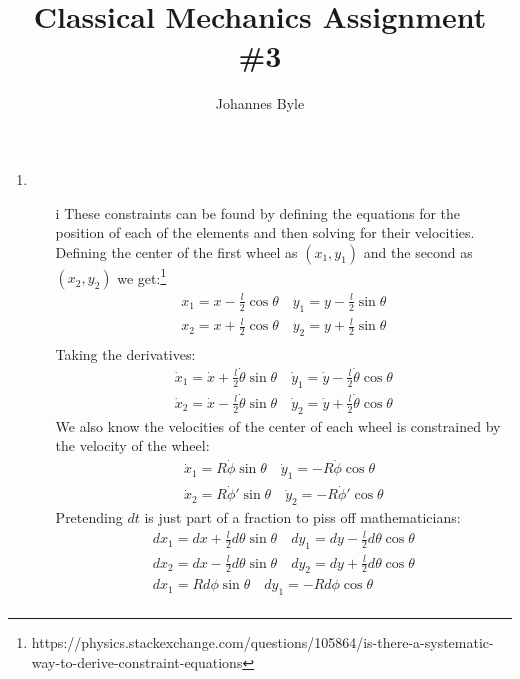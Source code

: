 \documentclass[12pt]{article}
\title{Classical Mechanics Assignment \#3}
\author{Johannes Byle}
\begin{document}
    \maketitle
    \begin{enumerate}
        \item
        \begin{enumerate}
            \item[i] These constraints can be found by defining the equations for the position of each of the elements and then solving for their velocities.
            Defining the center of the first wheel as $(x_1,y_1)$ and the second as $(x_2,y_2)$ we get:\footnote{https://physics.stackexchange.com/questions/105864/is-there-a-systematic-way-to-derive-constraint-equations}
            \begin{gather*}
                x_1=x-\frac{l}{2}\cos\theta\quad y_1=y-\frac{l}{2}\sin\theta\\
                x_2=x+\frac{l}{2}\cos\theta\quad y_2=y+\frac{l}{2}\sin\theta\\
            \end{gather*}
            Taking the derivatives:
            \begin{gather*}
                \dot{x}_1=\dot{x}+\frac{l}{2}\dot{\theta}\sin\theta\quad \dot{y}_1=\dot{y}-\frac{l}{2}\dot{\theta}\cos\theta\\
                \dot{x}_2=\dot{x}-\frac{l}{2}\dot{\theta}\sin\theta\quad \dot{y}_2=\dot{y}+\frac{l}{2}\dot{\theta}\cos\theta
            \end{gather*}
            We also know the velocities of the center of each wheel is constrained by the velocity of the wheel:
            \begin{gather*}
                \dot{x}_1=R\dot{\phi}\sin\theta\quad \dot{y}_1=-R\dot{\phi}\cos\theta\\
                \dot{x}_2=R\dot{\phi}'\sin\theta\quad \dot{y}_2=-R\dot{\phi}'\cos\theta
            \end{gather*}
            Pretending $dt$ is just part of a fraction to piss off mathematicians:
            \begin{gather*}
                dx_1=dx+\frac{l}{2}d\theta\sin\theta\quad dy_1=dy-\frac{l}{2}d\theta\cos\theta\\
                dx_2=dx-\frac{l}{2}d\theta\sin\theta\quad dy_2=dy+\frac{l}{2}d\theta\cos\theta\\
                dx_1=Rd\phi\sin\theta\quad dy_1=-Rd\phi\cos\theta\\

\end{gather*}
\end{enumerate}
\end{enumerate}
\end{document}

